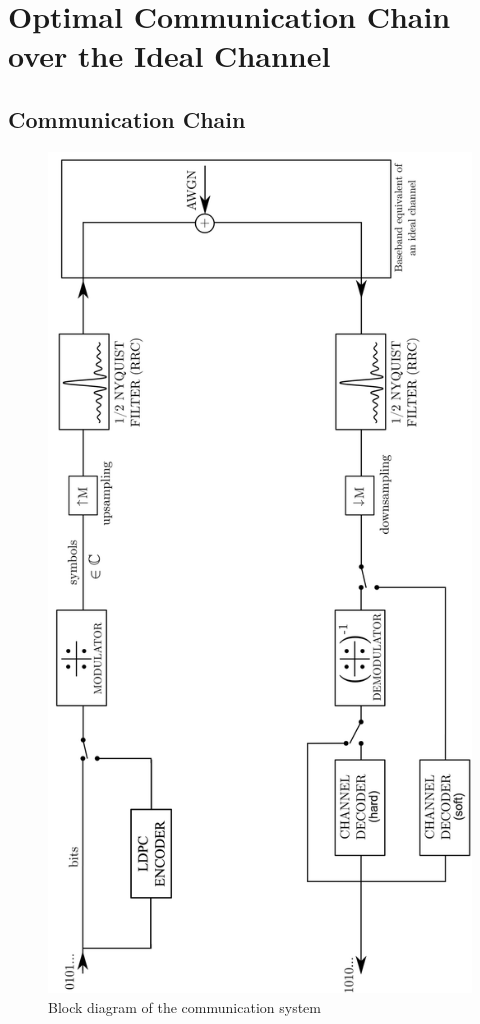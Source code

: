 \section{Optimal Communication Chain over the Ideal Channel}
\subsection{Communication Chain}
\begin{figure}[H]
	\centering
	\includegraphics[angle=-90, width=0.9\linewidth]{Images/com-chain}
	\caption{Block diagram of the communication system}
	\label{fig:com-chain}
\end{figure}
